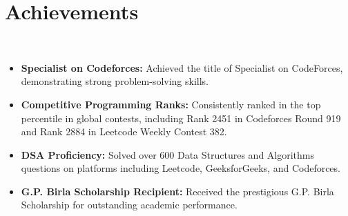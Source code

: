\documentclass[a4paper,8pt]{article}
\begin{document}
\section{Achievements}
\\[2pt]

\begin{minipage}[t]{\linewidth}
    \begin{itemize}[nosep,after=\strut, leftmargin=2em, itemsep=1pt]
        \item \textbf{Specialist on Codeforces: }Achieved the title of Specialist on CodeForces, demonstrating strong problem-solving skills.
        \item \textbf{Competitive Programming Ranks:} Consistently ranked in the top percentile in global contests, including Rank 2451 in Codeforces Round 919 and Rank 2884 in Leetcode Weekly Contest 382.
        \item \textbf{DSA Proficiency:} Solved over 600 Data Structures and Algorithms questions on platforms including Leetcode, GeeksforGeeks, and Codeforces.
        \item \textbf{G.P. Birla Scholarship Recipient:} Received the prestigious G.P. Birla Scholarship for outstanding academic performance. 
    \end{itemize}
\end{minipage}
\end{document}
